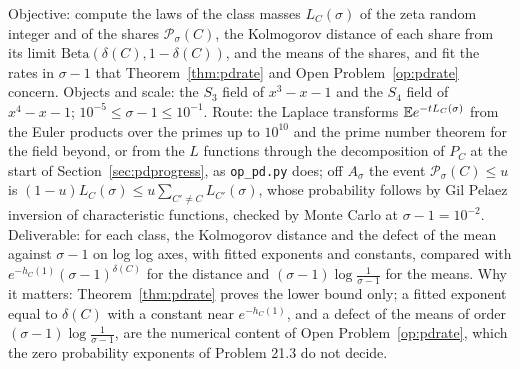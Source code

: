 \begin{compproblem}[Laws of class shares near $\sigma=1$]\label{cp:pdshares}
Objective: compute the laws of the class masses $L_C(\sigma)$ of the zeta random integer and of the shares $\mathcal P_\sigma(C)$, the Kolmogorov distance of each share from its limit $\mathrm{Beta}(\delta(C),1-\delta(C))$, and the means of the shares, and fit the rates in $\sigma-1$ that Theorem~\ref{thm:pdrate} and Open Problem~\ref{op:pdrate} concern. Objects and scale: the $S_3$ field of $x^3-x-1$ and the $S_4$ field of $x^4-x-1$; $10^{-5}\le\sigma-1\le10^{-1}$. Route: the Laplace transforms $\mathbb{E} e^{-tL_C(\sigma)}$ from the Euler products over the primes up to $10^{10}$ and the prime number theorem for the field beyond, or from the $L$ functions through the decomposition of $P_C$ at the start of Section~\ref{sec:pdprogress}, as \texttt{op\_pd.py} does; off $A_\sigma$ the event $\mathcal P_\sigma(C)\le u$ is $(1-u)L_C(\sigma)\le u\sum_{C'\ne C}L_{C'}(\sigma)$, whose probability follows by Gil Pelaez inversion of characteristic functions, checked by Monte Carlo at $\sigma-1=10^{-2}$. Deliverable: for each class, the Kolmogorov distance and the defect of the mean against $\sigma-1$ on log log axes, with fitted exponents and constants, compared with $e^{-h_C(1)}(\sigma-1)^{\delta(C)}$ for the distance and $(\sigma-1)\log\frac1{\sigma-1}$ for the means. Why it matters: Theorem~\ref{thm:pdrate} proves the lower bound only; a fitted exponent equal to $\delta(C)$ with a constant near $e^{-h_C(1)}$, and a defect of the means of order $(\sigma-1)\log\frac1{\sigma-1}$, are the numerical content of Open Problem~\ref{op:pdrate}, which the zero probability exponents of Problem 21.3 do not decide.
\end{compproblem}

